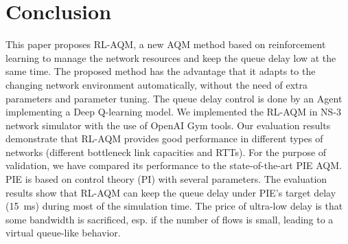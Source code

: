 \documentclass[conference]{IEEEtran}
\begin{document}
\section{Conclusion}
This paper proposes RL-AQM, a new AQM method based on reinforcement learning to manage the network resources and keep the queue delay low at the same time. The proposed method has the advantage that it adapts to the changing network environment automatically, without the need of extra parameters and parameter tuning. The queue delay control is done by an Agent implementing a Deep Q-learning model. We implemented the RL-AQM in NS-3 network simulator with the use of OpenAI Gym tools. Our evaluation results demonstrate that RL-AQM provides good performance in different types of networks (different bottleneck link capacities and RTTs). For the purpose of validation, we have compared its performance to the state-of-the-art PIE AQM. PIE is based on control theory (PI) with several parameters. 
The evaluation results show that RL-AQM can keep the queue delay under PIE's target delay  (15~ms) during most of the simulation time. The price of ultra-low delay is that some bandwidth is sacrificed, esp. if the number of flows is small, leading to a virtual queue-like behavior.








\end{document}
